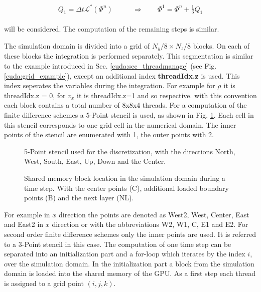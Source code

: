 \begin{align}
    \begin{split}
    Q_1 = \Delta t \mathcal{L}^*\left(\Phi^n\right)\qquad &\Rightarrow \qquad \Phi^{1} = \Phi^n + \frac{1}{3}Q_1
    \end{split}
\end{align}

will be considered.  The computation of the remaining steps is similar.


The simulation domain is divided into a grid of  $N_y/8 \times N_z/8$ blocks. On each of these blocks the integration is performed separately.
This segmentation is similar to the example introduced in Sec. \ref{cuda:sec_threadmanage} (see Fig. \ref{cuda:grid_example}), except an
additional index \textbf{threadIdx.z} is used.
This index seperates the variables during the integration.
For example for $\rho$ it is threadIdx.z = 0, for $v_x$  it is threadIdx.z=1 and so respective.
with this convention each block contains a total number of 8x8x4 threads.
For a computation of the finite difference schemes  a 5-Point stencil is used, as shown in Fig. \ref{cuda:stencil}.
Each cell in this stencil corresponds to one grid cell in the numerical domain.
The inner points of the stencil are enumerated with 1, the outer points with 2.


\begin{figure}[!bp]
      \centering
        \caption{
            5-Point stencil used for the discretization, with the directions North, West, South, East, Up, Down and the Center.
        }
       \label{cuda:stencil}
\end{figure}

\begin{figure}[!bp]
      \centering
       \caption{
           Shared memory block location in the simulation domain during a time step. With the center points (C), additional loaded boundary  points (B)
           and the next layer (NL).
       }
       \label{cuda:timestep_algo_img}
\end{figure}
\clearpage

For example in $x$ direction the points are denoted as West2,
West, Center, East and East2 in $x$ direction or with the abbreviations W2, W1, C, E1 and E2.
For second order finite difference schemes only the inner points  are used. It is referred to a  3-Point stencil in this case.
The computation of one time step can be separated into an initialization part and a for-loop which iterates by the index $i$, over the simulation domain.
In the initialization part a block from the simulation domain is loaded into the shared memory of the GPU.
As a first step each thread is assigned to a grid point $(i, j, k)$.

